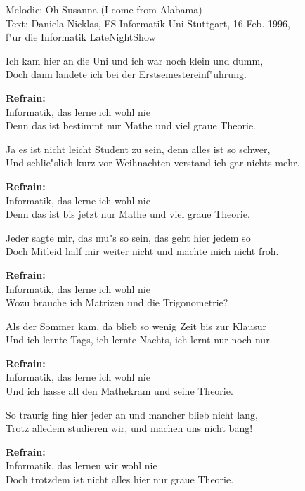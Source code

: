 

\begin{songinfo}
Melodie: Oh Susanna (I come from Alabama)\\
Text: Daniela Nicklas, FS Informatik Uni Stuttgart, 16 Feb. 1996,\\
f"ur die Informatik LateNightShow
\end{songinfo}

\begin{song}

Ich kam hier an die Uni und ich war noch klein und dumm,\\
Doch dann landete ich bei der Erstsemestereinf"uhrung.\X{[C7]}

\Xvspace

\textbf{Refrain:}\\
Informatik, das lerne ich wohl nie\\
Denn das ist bestimmt nur Mathe und viel graue Theorie.

\Xvspace

Ja es ist nicht leicht Student zu sein, denn alles ist so schwer,\\
Und schlie"slich kurz vor Weihnachten verstand ich gar nichts mehr.

\textbf{Refrain:}\\
Informatik, das lerne ich wohl nie\\
Denn das ist bis jetzt nur Mathe und viel graue Theorie.

Jeder sagte mir, das mu"s so sein, das geht hier jedem so\\
Doch Mitleid half mir weiter nicht und machte mich nicht froh.

\textbf{Refrain:}\\
Informatik, das lerne ich wohl nie\\
Wozu brauche ich Matrizen und die Trigonometrie?

Als der Sommer kam, da blieb so wenig Zeit bis zur Klausur\\
Und ich lernte Tags, ich lernte Nachts, ich lernt nur noch nur.

\textbf{Refrain:}\\
Informatik, das lerne ich wohl nie\\
Und ich hasse all den Mathekram und seine Theorie.

So traurig fing hier jeder an und mancher blieb nicht lang,\\
Trotz alledem studieren wir, und machen uns nicht bang!

\textbf{Refrain:}\\
Informatik, das lernen wir wohl nie\\
Doch trotzdem ist nicht alles hier nur graue Theorie.

\end{song}
